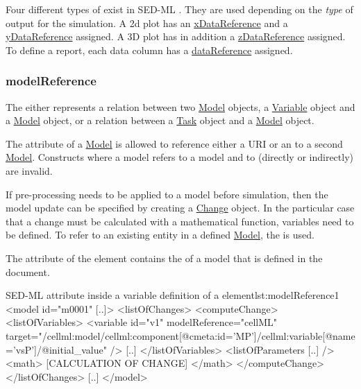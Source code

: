 Four different types of  exist in SED-ML \currentLV. They are used depending on the \emph{type} of output for the simulation. A 2d plot has an \hyperref[sec:xDataReference]{xDataReference} and a \hyperref[sec:yDataReference]{yDataReference} assigned. A 3D plot has in addition a \hyperref[sec:zDataReference]{zDataReference} assigned. To define a report, each data column has a \hyperref[sec:dataReference1]{dataReference} assigned.


\subsubsection{modelReference}
\label{sec:modelReference}
%
The  either represents a relation between two \hyperref[class:model]{Model} objects, a \hyperref[class:variable]{Variable} object and a \hyperref[class:model]{Model} object, or  a relation between a \hyperref[class:task]{Task} object and a \hyperref[class:model]{Model} object.

The  attribute of a \hyperref[class:model]{Model} is allowed to reference either a URI or an  to a second \hyperref[class:model]{Model}. Constructs where a model  refers to a model  and  to  (directly or indirectly) are invalid.

If pre-processing needs to be applied to a model before simulation, then the model update can be specified by creating a \hyperref[class:change]{Change} object. In the particular case that a change must be calculated with a mathematical function, variables need to be defined. To refer to an existing entity in a defined \hyperref[class:model]{Model}, the  is used. 

The  attribute of the  element contains the  of a model that is defined in the document. 


\begin{myXmlLst}{SED-ML  attribute inside a variable definition of a  element}{lst:modelReference1}
<model id="m0001" [..]>
	<listOfChanges>
		<computeChange>
			<listOfVariables>
				<variable id="v1" modelReference="cellML" target="/cellml:model/cellml:component[@cmeta:id='MP']/cellml:variable[@name='vsP']/@initial_value" />
     			[..]
			</listOfVariables>
			<listOfParameters [..] />
    			<math>
     			[CALCULATION OF CHANGE]
    			</math>
   		</computeChange>
	</listOfChanges>
	[..]
</model>
\end{myXmlLst}

